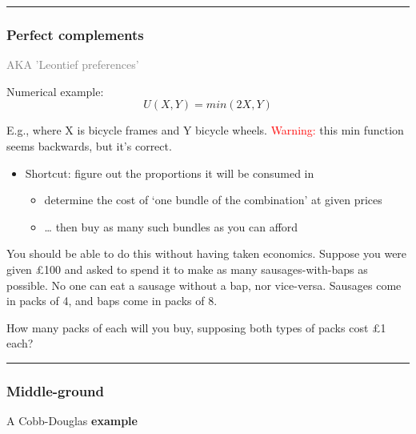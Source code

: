 \documentclass[]{article}
\providecommand{\tightlist}{%
  \setlength{\itemsep}{0pt}\setlength{\parskip}{0pt}}
\begin{document}
\begin{center}\rule{0.5\linewidth}{\linethickness}\end{center}

\hypertarget{perfect-complements}{%
\subsubsection{Perfect complements}\label{perfect-complements}}

\textcolor{gray}{AKA 'Leontief preferences'}

Numerical example:\\

\[U(X,Y)=min(2X,Y)\]

E.g., where X is bicycle frames and Y bicycle wheels. \textcolor{red}{Warning:} this min function seems backwards, but it's correct.

\bigskip

\begin{itemize}
\tightlist
\item
  Shortcut: figure out the proportions it will be consumed in

  \begin{itemize}
  \tightlist
  \item
    determine the cost of `one bundle of the combination' at given prices
  \item
    \ldots{} then buy as many such bundles as you can afford
  \end{itemize}
\end{itemize}

You should be able to do this without having taken economics.
Suppose you were given £100 and asked to spend it to make as many sausages-with-baps as possible.
No one can eat a sausage without a bap, nor vice-versa.
Sausages come in packs of 4, and baps come in packs of 8.

How many packs of each will you buy, supposing both types of packs cost £1 each?

\begin{center}\rule{0.5\linewidth}{\linethickness}\end{center}

\hypertarget{middle-ground}{%
\subsubsection{Middle-ground}\label{middle-ground}}

A Cobb-Douglas \textbf{example}
\end{document}
